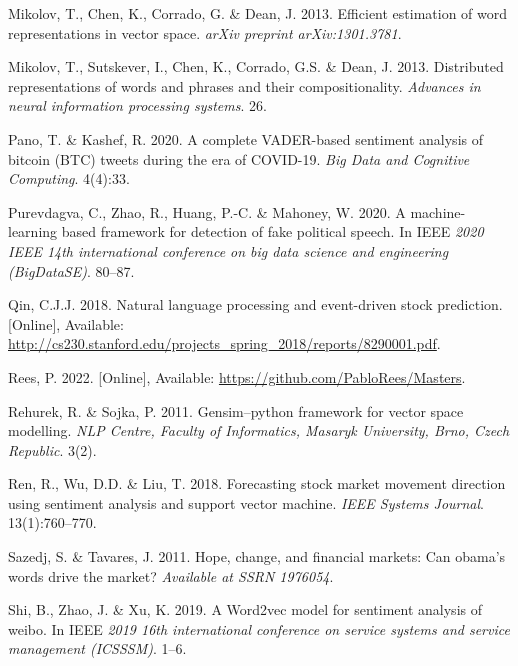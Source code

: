 \documentclass[11pt,preprint, authoryear]{elsarticle}
\numberwithin{equation}{section}
\numberwithin{figure}{section}
\numberwithin{table}{section}
\newlength{\cslhangindent}
\newenvironment{CSLReferences}%
  {\setlength{\parindent}{0pt}%
  \everypar{\setlength{\hangindent}{\cslhangindent}}\ignorespaces}%
  {\par}
\begin{document}
\begin{CSLReferences}{1}{0}
\leavevmode{}%
Mikolov, T., Chen, K., Corrado, G. \& Dean, J. 2013. Efficient
estimation of word representations in vector space. \emph{arXiv preprint
arXiv:1301.3781}.

\leavevmode{}%
Mikolov, T., Sutskever, I., Chen, K., Corrado, G.S. \& Dean, J. 2013.
Distributed representations of words and phrases and their
compositionality. \emph{Advances in neural information processing
systems}. 26.

\leavevmode{}%
Pano, T. \& Kashef, R. 2020. A complete VADER-based sentiment analysis
of bitcoin (BTC) tweets during the era of COVID-19. \emph{Big Data and
Cognitive Computing}. 4(4):33.

\leavevmode{}%
Purevdagva, C., Zhao, R., Huang, P.-C. \& Mahoney, W. 2020. A
machine-learning based framework for detection of fake political speech.
In IEEE \emph{2020 IEEE 14th international conference on big data
science and engineering (BigDataSE)}. 80--87.

\leavevmode{}%
Qin, C.J.J. 2018. Natural language processing and event-driven stock
prediction. {[}Online{]}, Available:
\url{http://cs230.stanford.edu/projects_spring_2018/reports/8290001.pdf}.

\leavevmode{}%
Rees, P. 2022. {[}Online{]}, Available:
\url{https://github.com/PabloRees/Masters}.

\leavevmode{}%
Rehurek, R. \& Sojka, P. 2011. Gensim--python framework for vector space
modelling. \emph{NLP Centre, Faculty of Informatics, Masaryk University,
Brno, Czech Republic}. 3(2).

\leavevmode{}%
Ren, R., Wu, D.D. \& Liu, T. 2018. Forecasting stock market movement
direction using sentiment analysis and support vector machine.
\emph{IEEE Systems Journal}. 13(1):760--770.

\leavevmode{}%
Sazedj, S. \& Tavares, J. 2011. Hope, change, and financial markets: Can
obama's words drive the market? \emph{Available at SSRN 1976054}.

\leavevmode{}%
Shi, B., Zhao, J. \& Xu, K. 2019. A Word2vec model for sentiment
analysis of weibo. In IEEE \emph{2019 16th international conference on
service systems and service management (ICSSSM)}. 1--6.


\end{CSLReferences}
\end{document}

